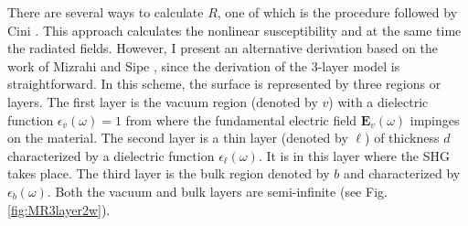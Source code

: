 There are several ways to calculate $R$, one of which is the procedure followed
by Cini \cite{ciniPRB91}. This approach calculates the nonlinear susceptibility
and at the same time the radiated fields. However, I present an alternative
derivation based on the work of Mizrahi and Sipe \cite{mizrahiJOSA88}, since the
derivation of the 3-layer model is straightforward. In this scheme, the surface
is represented by three regions or layers. The first layer is the vacuum region
(denoted by $v$) with a dielectric function $\epsilon_{v}(\omega)=1$ from where
the fundamental electric field $\mathbf{E}_{v}(\omega)$ impinges on the
material. The second layer is a thin layer (denoted by $\ell$) of thickness $d$
characterized by a dielectric function $\epsilon_{\ell}(\omega)$. It is in this
layer where the SHG takes place. The third layer is the bulk region denoted by
$b$ and characterized by $\epsilon_{b}(\omega)$. Both the vacuum and bulk layers
are semi-infinite (see Fig. \ref{fig:MR3layer2w}).


